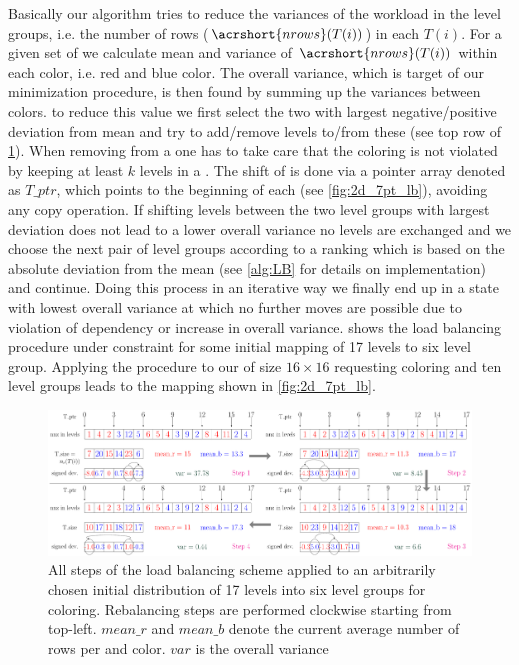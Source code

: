 Basically our algorithm tries to reduce the variances of the workload in the level groups, i.e. the number of rows ($\acrshort{nrows}(T(i))$) in each \levelGroup $T(i)$. For a given set of \levelGroups we calculate mean and variance of $\acrshort{nrows}(T(i))$ within each color, i.e. red and blue color.  
The overall variance, which is target of our minimization procedure, is then found by summing up the variances between colors. \Inorder to reduce this value we first select the two \levelGroups with largest negative/positive deviation from mean and try to add/remove levels to/from these \levelGroups (see top row of \cref{fig:lb_alg}). When removing \levels from a \levelGroup one has to take care that the \DK coloring is not violated by keeping at least $k$ levels in a \levelGroup. The shift of \levels is done via a pointer array denoted as $T\_ptr$, which points to the beginning of each \levelGroup (see \cref{fig:2d_7pt_lb}), avoiding any copy operation. If shifting levels between the two level groups with largest deviation does not lead to a lower overall variance no levels are exchanged and we choose the next pair of level groups according to a ranking which is based on the absolute deviation from the mean (see \cref{alg:LB} for details on implementation) and continue. Doing this process in an iterative way we finally end up in a state with lowest overall variance at which no further moves are possible due to violation of \DK dependency or increase in overall variance.  shows the load balancing procedure under \DTWO constraint for some initial mapping of 17 levels to six level group. Applying the procedure to our  \stex of size $16 \times 16$  requesting \DTWO coloring and ten level groups leads to the mapping shown in \cref{fig:2d_7pt_lb}. 
  
   \begin{figure}[tbhp]
   	\centering
   	\includegraphics[height=0.22\textheight,width=\textwidth]{pics/load_balancing/lb_alg/lb_all}
   	\caption{All steps of the load balancing scheme applied to an arbitrarily chosen initial distribution of 17 levels into six level groups for \DTWO coloring. Rebalancing steps are performed clockwise starting from top-left. $mean\_r$ and $mean\_b$ denote the current average number of rows per \levelGroup and color. $var$ is the overall  variance}
   	\label{fig:lb_alg}
   \end{figure}
   
